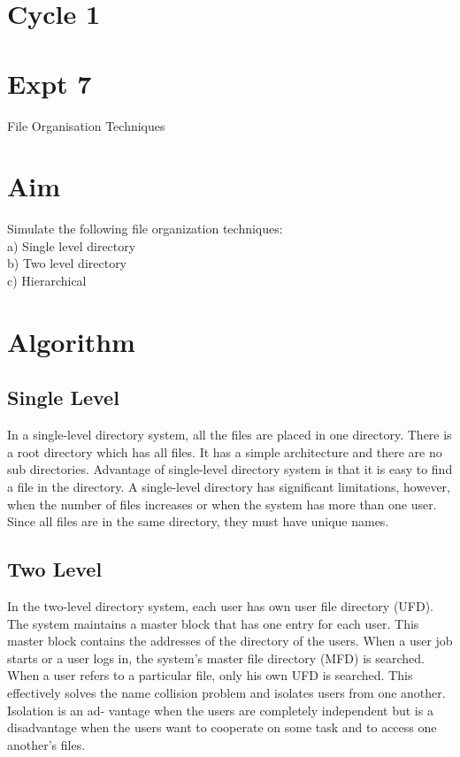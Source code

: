 \documentclass[13pt,oneside]{book}
\begin{document}
\section*{Cycle 1}
\section*{Expt 7}
\begin{center}
	\Large{File Organisation Techniques}
\end{center}
\section*{Aim}
\large
Simulate the following file organization techniques:\\
 a) Single level directory\\
 b) Two level directory\\
 c) Hierarchical\\
\section*{Algorithm} 
\subsection{Single Level}
In a single-level directory system, all the files are placed in one directory. There
is a root directory which has all files. It has a simple architecture and there are no
sub directories. Advantage of single-level directory system is that it is easy to find
a file in the directory. A single-level directory has significant limitations, however,
when the number of files increases or when the system has more than one user. Since
all files are in the same directory, they must have unique names.
\subsection{Two Level}
In the two-level directory system, each user has own user file directory (UFD).
The system maintains a master block that has one entry for each user. This master
block contains the addresses of the directory of the users. When a user job starts
or a user logs in, the system’s master file directory (MFD) is searched. When a
user refers to a particular file, only his own UFD is searched. This effectively solves
the name collision problem and isolates users from one another. Isolation is an ad-
vantage when the users are completely independent but is a disadvantage when the
users want to cooperate on some task and to access one another’s files.
\end{document}
